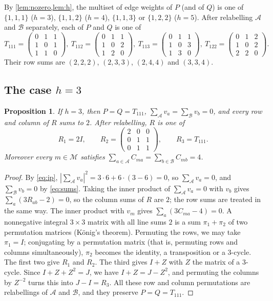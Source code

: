 \documentclass[11pt,a4paper]{amsart}
\newtheorem{proposition}[theorem]{Proposition}
\theoremstyle{definition}
\theoremstyle{remark}
\newcommand{\cA}{\mathcal{A}}
\newcommand{\cB}{\mathcal{B}}
\newcommand{\cM}{\mathcal{M}}
\begin{document}
By \cref{lem:nozero,lem:h}, the multiset of edge weights of $P$ (and of $Q$) is one of $\{1,1,1\}$ ($h=3$),
$\{1,1,2\}$ ($h=4$), $\{1,1,3\}$ or $\{1,2,2\}$ ($h=5$). After relabelling $\cA$ and $\cB$ separately, each of
$P$ and $Q$ is one of
\[
T_{111}=\begin{pmatrix}0&1&1\\1&0&1\\1&1&0\end{pmatrix},\
T_{112}=\begin{pmatrix}0&1&1\\1&0&2\\1&2&0\end{pmatrix},\
T_{113}=\begin{pmatrix}0&1&1\\1&0&3\\1&3&0\end{pmatrix},\
T_{122}=\begin{pmatrix}0&1&2\\1&0&2\\2&2&0\end{pmatrix}.
\]
Their row sums are $(2,2,2)$, $(2,3,3)$, $(2,4,4)$ and $(3,3,4)$.

\subsection{The case \texorpdfstring{$h=3$}{h=3}}

\begin{proposition}\label{prop:h3}
If $h=3$, then $P=Q=T_{111}$, $\sum_{\cA}v_a=\sum_{\cB}v_b=0$, and every row and column of $R$ sums to $2$.
After relabelling, $R$ is one of
\[
R_1=2I,\qquad R_2=\begin{pmatrix}2&0&0\\0&1&1\\0&1&1\end{pmatrix},\qquad R_3=T_{111}.
\]
Moreover every $m\in\cM$ satisfies $\sum_{a\in\cA}C_{ma}=\sum_{b\in\cB}C_{mb}=4$.
\end{proposition}

\begin{proof}
By \eqref{eq:ip}, $|\sum_\cA v_a|^2=3\cdot6+6\cdot(3-6)=0$, so $\sum_\cA v_a=0$, and $\sum_\cB v_b=0$ by
\eqref{eq:sums}. Taking the inner product of $\sum_\cA v_a=0$ with $v_b$ gives $\sum_a(3R_{ab}-2)=0$, so the
column sums of $R$ are $2$; the row sums are treated in the same way. The inner product with $v_m$ gives
$\sum_a(3C_{ma}-4)=0$. A nonnegative integral $3\times3$ matrix with all line sums $2$ is a sum $\pi_1+\pi_2$ of
two permutation matrices (König's theorem). Permuting the rows, we may take $\pi_1=I$; conjugating by a
permutation matrix (that is, permuting rows and columns simultaneously), $\pi_2$ becomes the identity, a
transposition or a $3$-cycle. The first two give $R_1$ and $R_2$. The third gives $I+Z$ with $Z$ the matrix
of a $3$-cycle. Since $I+Z+Z^2=J$, we have $I+Z=J-Z^2$, and permuting the columns by $Z^{-2}$ turns this into
$J-I=R_3$. All these row and column permutations are relabellings of $\cA$ and $\cB$, and they preserve
$P=Q=T_{111}$.
\end{proof}
\end{document}
